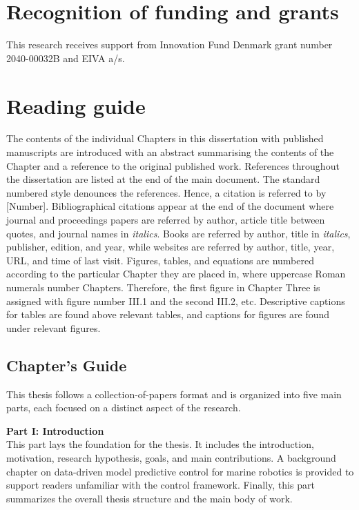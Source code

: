 \section*{Recognition of funding and grants}
This research receives support from Innovation Fund Denmark grant number 2040-00032B and EIVA a/s.

\section*{Reading guide}
The contents of the individual Chapters in this dissertation with published manuscripts are introduced with an abstract summarising the contents of the Chapter and a reference to the original published work. References throughout the dissertation are listed at the end of the main document. The standard numbered style denounces the references. Hence, a citation is referred to by [Number]. Bibliographical citations appear at the end of the document where journal and proceedings papers are referred by author, article title between quotes, and journal names in \textit{italics}. Books are referred by author, title in \textit{italics}, publisher, edition, and year, while websites are referred by author, title, year, URL, and time of last visit. Figures, tables, and equations are numbered according to the particular Chapter they are placed in, where uppercase Roman numerals number Chapters. Therefore, the first figure in Chapter Three is assigned with figure number III.1 and the second III.2, etc. Descriptive captions for tables are found above relevant tables, and captions for figures are found under relevant figures. 

\subsection*{Chapter's Guide}
This thesis follows a collection-of-papers format and is organized into five main parts, each focused on a distinct aspect of the research.

\noindent \textbf{Part I: Introduction} \\
This part lays the foundation for the thesis. It includes the introduction, motivation, research hypothesis, goals, and main contributions. A background chapter on data-driven model predictive control for marine robotics is provided to support readers unfamiliar with the control framework. Finally, this part summarizes the overall thesis structure and the main body of work.

